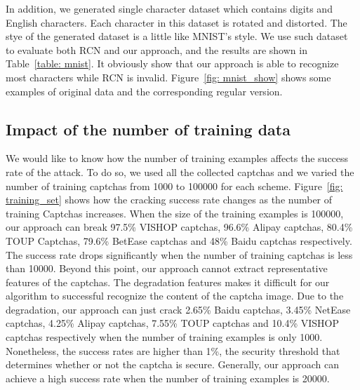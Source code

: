 In addition, we generated single character dataset which contains digits and English characters. Each character in this dataset is rotated and distorted. The stye of the generated dataset is a little like MNIST's style.
We use such dataset to evaluate both RCN and our approach, and the results are shown in Table~\ref{table: mnist}. It obviously show that our approach is able to recognize most characters while RCN is invalid. Figure~\ref{fig: mnist_show} shows some examples of original data and the corresponding regular version.

\subsection{Impact of the number of training data}
We would like to know how the number of training examples affects the success rate of the attack. To do so, we used all the collected captchas and we varied the number of training captchas from 1000 to 100000 for each scheme. Figure~\ref{fig: training_set} shows how the cracking success rate changes as the number of training Captchas increases. When the size of the training examples is 100000, our approach can break 97.5\% VISHOP captchas, 96.6\% Alipay captchas, 80.4\% TOUP Captchas, 79.6\% BetEase captchas and 48\% Baidu captchas respectively. The success rate drops significantly when the number of training captchas is less than 10000. Beyond this point, our approach cannot extract representative features of the captchas. The degradation features makes it difficult for our algorithm to successful recognize the content of the captcha image.
Due to the degradation, our approach can just crack 2.65\% Baidu captchas, 3.45\% NetEase captchas, 4.25\% Alipay captchas, 7.55\% TOUP captchas and 10.4\% VISHOP captchas respectively when the number of training examples is only 1000. Nonetheless, the success rates are higher than 1\%, the security threshold that determines whether or not the captcha is secure.
Generally, our approach can achieve a high success rate when the number of training examples is 20000.

